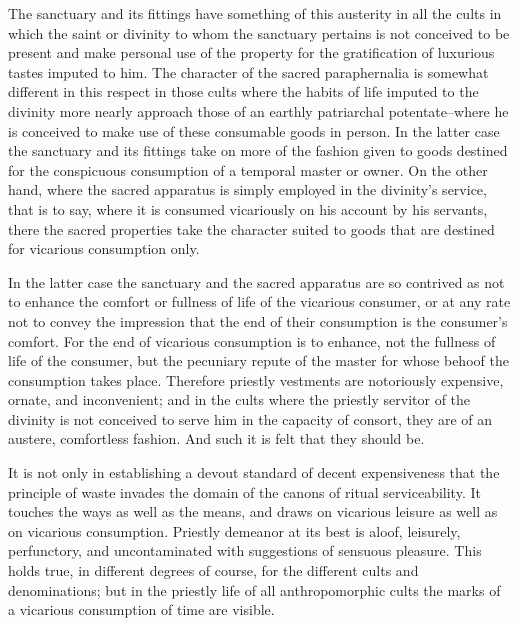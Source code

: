 \documentclass[12pt]{report}
\begin{document}
The sanctuary and its fittings have something of this austerity in all
the cults in which the saint or divinity to whom the sanctuary pertains
is not conceived to be present and make personal use of the property for
the gratification of luxurious tastes imputed to him. The character of
the sacred paraphernalia is somewhat different in this respect in those
cults where the habits of life imputed to the divinity more nearly
approach those of an earthly patriarchal potentate--where he is
conceived to make use of these consumable goods in person. In the latter
case the sanctuary and its fittings take on more of the fashion given to
goods destined for the conspicuous consumption of a temporal master or
owner. On the other hand, where the sacred apparatus is simply employed
in the divinity's service, that is to say, where it is consumed
vicariously on his account by his servants, there the sacred properties
take the character suited to goods that are destined for vicarious
consumption only.

In the latter case the sanctuary and the sacred apparatus are so
contrived as not to enhance the comfort or fullness of life of the
vicarious consumer, or at any rate not to convey the impression that
the end of their consumption is the consumer's comfort. For the end of
vicarious consumption is to enhance, not the fullness of life of the
consumer, but the pecuniary repute of the master for whose behoof the
consumption takes place. Therefore priestly vestments are notoriously
expensive, ornate, and inconvenient; and in the cults where the priestly
servitor of the divinity is not conceived to serve him in the capacity
of consort, they are of an austere, comfortless fashion. And such it is
felt that they should be.

It is not only in establishing a devout standard of decent expensiveness
that the principle of waste invades the domain of the canons of ritual
serviceability. It touches the ways as well as the means, and draws on
vicarious leisure as well as on vicarious consumption. Priestly demeanor
at its best is aloof, leisurely, perfunctory, and uncontaminated with
suggestions of sensuous pleasure. This holds true, in different degrees
of course, for the different cults and denominations; but in the
priestly life of all anthropomorphic cults the marks of a vicarious
consumption of time are visible.
\end{document}
